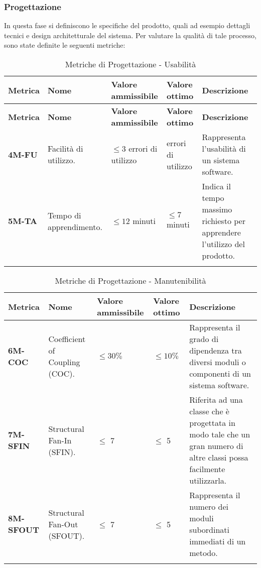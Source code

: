 \subsubsection{Progettazione}
In questa fase si definiscono le specifiche del prodotto, quali ad esempio dettagli tecnici e design architetturale del sistema.
Per valutare la qualità di tale processo, sono state definite le seguenti metriche:
\begin{longtable}{|>{\raggedright\arraybackslash}m{}|>{\raggedright\arraybackslash}m{}|>{\raggedright\arraybackslash}m{}|>{\raggedright\arraybackslash}m{}|>{\raggedright\arraybackslash}m{}|}
	\hline
	\textbf{Metrica} & \textbf{Nome} & \textbf{Valore ammissibile} & \textbf{Valore ottimo} & \textbf{Descrizione}\\
	\hline
	\endfirsthead
	\hline
	\textbf{Metrica} & \textbf{Nome} & \textbf{Valore ammissibile} & \textbf{Valore ottimo} & \textbf{Descrizione}\\
	\endhead
	\textbf{4M-FU}   & Facilità di utilizzo. & $\leq 3 $ errori di utilizzo & 0 errori di utilizzo   & Rappresenta l'usabilità di un sistema software.                           \\
	\hline
	\textbf{5M-TA}   & Tempo di apprendimento. & $\leq 12 $ minuti & $\leq 7 $ minuti & Indica il tempo massimo richiesto per apprendere l'utilizzo del prodotto. \\
	\hline
	\caption{Metriche di Progettazione - Usabilità}
	\label{table:2}
\end{longtable}

\begin{longtable}{|>{\raggedright\arraybackslash}m{}|>{\raggedright\arraybackslash}m{}|>{\raggedright\arraybackslash}m{}|>{\raggedright\arraybackslash}m{}|>{\raggedright\arraybackslash}m{}|}
	\hline
	\textbf{Metrica} & \textbf{Nome} & \textbf{Valore ammissibile} & \textbf{Valore ottimo} & \textbf{Descrizione}\\
	\hline
	\endfirsthead
	\hline
	\textbf{6M-COC} & Coefficient of Coupling (COC). & $\leq 30\% $ & $\leq 10\% $ & Rappresenta il grado di dipendenza tra diversi moduli o componenti di un sistema software. \\
	\hline
	\textbf{7M-SFIN} & Structural Fan-In (SFIN). & $\leq$ 7 & $\le$ 5 & Riferita ad una classe che è progettata in modo tale che un gran numero di altre classi possa facilmente utilizzarla. \\
	\hline
	\textbf{8M-SFOUT} & Structural Fan-Out (SFOUT). & $\leq$ 7 & $\le$ 5 & Rappresenta il numero dei moduli subordinati immediati di un metodo. \\
	\hline 
	\caption{Metriche di Progettazione - Manutenibilità}
	\label{table:3}
\end{longtable}

